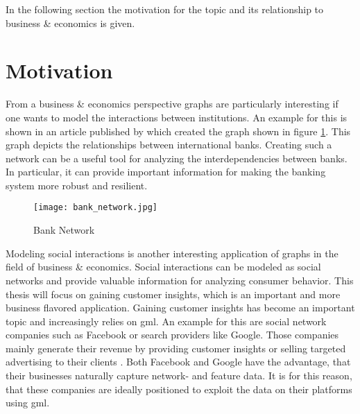 	\noindent In the following section the motivation for the topic and its
	relationship to business \& economics is given. 

	\section{Motivation}

	\noindent From a business \& economics perspective graphs are particularly
	interesting if one wants to model the interactions between institutions. An 
	example for this is shown in an article published by 
	\cite{schweitzer2009economic} which created the graph shown in figure
	\ref{fig:bank_network}. This graph depicts the relationships between 
	international banks. Creating such a network can be a useful tool for 
	analyzing the interdependencies between banks. In particular, it can 
	provide important information for making the banking system more robust and 
	resilient. 

	\begin{figure}[h]
		\centering
		\texttt{[image: bank\_network.jpg]}
		\caption{Bank Network}
		\cite[p. 424]{schweitzer2009economic}
		\label{fig:bank_network}
	\end{figure} 

	\noindent Modeling social interactions is another interesting application
	of graphs in the field of business \& economics. Social interactions can be
	modeled as social networks and provide valuable information for analyzing
	consumer behavior. This thesis will focus on gaining customer insights,
	which is an important and more business flavored application. Gaining
	customer insights has become an important topic and increasingly relies on
	\acs{gml}. An example for this are social network companies such as 
	Facebook or search providers like Google. Those companies mainly generate 
	their revenue by providing customer insights or selling targeted 
	advertising to their clients \citep{Facebook2021,Alphabet2021}. Both 
	Facebook and Google have the advantage, that their businesses naturally 
	capture network- and feature data. It is for this reason, that these
	companies are ideally positioned to exploit the data on their platforms
	using \acs{gml}. \\


